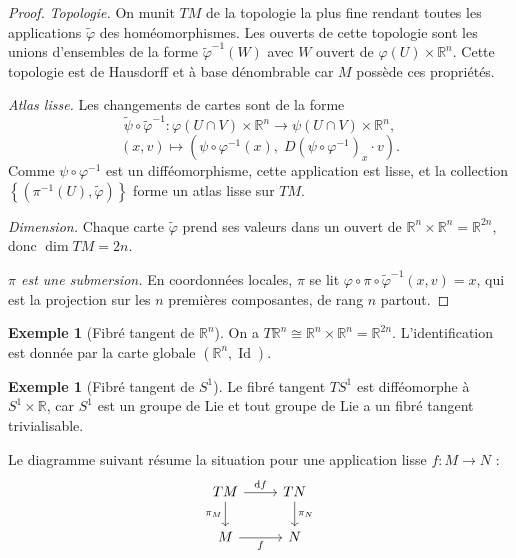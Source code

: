 \documentclass[12pt,a4paper,openany]{book}
\theoremstyle{definition}
\newtheorem{exemple}[definition]{Exemple}
\theoremstyle{plain}
\theoremstyle{remark}
\newcommand{\R}{\mathbb{R}}
\DeclareMathOperator{\Id}{Id}
\newcommand{\dd}{\mathrm{d}}
\newcommand{\set}[1]{\left\{#1\right\}}
\begin{document}
\begin{proof}
\emph{Topologie.}
On munit $TM$ de la topologie la plus fine rendant toutes les applications
$\widetilde{\varphi}$ des homéomorphismes. Les ouverts de cette topologie sont
les unions d'ensembles de la forme $\widetilde{\varphi}^{-1}(W)$ avec $W$ ouvert
de $\varphi(U) \times \R^n$. Cette topologie est de Hausdorff et à base dénombrable
car $M$ possède ces propriétés.

\emph{Atlas lisse.}
Les changements de cartes sont de la forme
\[
  \widetilde{\psi} \circ \widetilde{\varphi}^{-1} : \varphi(U \cap V) \times \R^n
  \longrightarrow \psi(U \cap V) \times \R^n,
\]
\[
  (x, v) \longmapsto \left(\psi \circ \varphi^{-1}(x),\;
  D(\psi \circ \varphi^{-1})_x \cdot v\right).
\]
Comme $\psi \circ \varphi^{-1}$ est un difféomorphisme, cette application est lisse,
et la collection $\set{(\pi^{-1}(U), \widetilde{\varphi})}$ forme un atlas lisse sur $TM$.

\emph{Dimension.}
Chaque carte $\widetilde{\varphi}$ prend ses valeurs dans un ouvert de $\R^n \times \R^n = \R^{2n}$,
donc $\dim TM = 2n$.

\emph{$\pi$ est une submersion.}
En coordonnées locales, $\pi$ se lit $\varphi \circ \pi \circ \widetilde{\varphi}^{-1}(x, v) = x$,
qui est la projection sur les $n$ premières composantes, de rang $n$ partout.
\end{proof}

\begin{exemple}[Fibré tangent de $\R^n$]\label{ex:TRn}
On a $T\R^n \cong \R^n \times \R^n = \R^{2n}$. L'identification est donnée
par la carte globale $(\R^n, \Id)$.
\end{exemple}

\begin{exemple}[Fibré tangent de $S^1$]\label{ex:TS1}
Le fibré tangent $TS^1$ est difféomorphe à $S^1 \times \R$, car $S^1$
est un groupe de Lie et tout groupe de Lie a un fibré tangent trivialisable.
\end{exemple}

Le diagramme suivant résume la situation pour une application lisse $f : M \to N$ :
\[
\begin{tikzcd}
  TM \arrow[r, "\dd f"] \arrow[d, "\pi_M"'] & TN \arrow[d, "\pi_N"] \\
  M \arrow[r, "f"'] & N
\end{tikzcd}
\]

\end{document}
